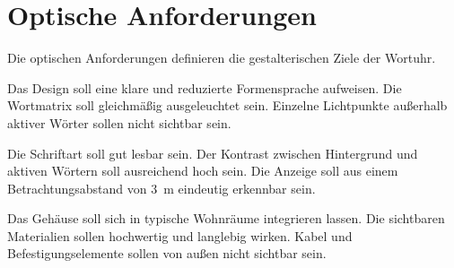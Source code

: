 \section{Optische Anforderungen} 
Die optischen Anforderungen definieren die gestalterischen Ziele der Wortuhr.

Das Design soll eine klare und reduzierte Formensprache aufweisen. Die Wortmatrix soll gleichmäßig ausgeleuchtet sein. Einzelne Lichtpunkte außerhalb aktiver Wörter sollen nicht sichtbar sein.

Die Schriftart soll gut lesbar sein. Der Kontrast zwischen Hintergrund und aktiven Wörtern soll ausreichend hoch sein. Die Anzeige soll aus einem Betrachtungsabstand von 3~m eindeutig erkennbar sein.

Das Gehäuse soll sich in typische Wohnräume integrieren lassen. Die sichtbaren Materialien sollen hochwertig und langlebig wirken. Kabel und Befestigungselemente sollen von außen nicht sichtbar sein.
